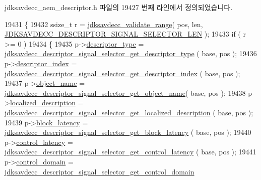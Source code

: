 jdksavdecc\+\_\+aem\+\_\+descriptor.\+h 파일의 19427 번째 라인에서 정의되었습니다.


\begin{DoxyCode}
19431 \{
19432     ssize\_t r = \hyperlink{group__util_ga9c02bdfe76c69163647c3196db7a73a1}{jdksavdecc\_validate\_range}( pos, len, 
      \hyperlink{group__descriptor__signal__selector_gac2216dd9d51df77aa73eb7459e73022c}{JDKSAVDECC\_DESCRIPTOR\_SIGNAL\_SELECTOR\_LEN} );
19433     \textcolor{keywordflow}{if} ( r >= 0 )
19434     \{
19435         p->\hyperlink{structjdksavdecc__descriptor__signal__selector_ab7c32b6c7131c13d4ea3b7ee2f09b78d}{descriptor\_type} = 
      \hyperlink{group__descriptor__signal__selector_gaeb5dced295d94393a270851da64bf3f7}{jdksavdecc\_descriptor\_signal\_selector\_get\_descriptor\_type}
      ( base, pos );
19436         p->\hyperlink{structjdksavdecc__descriptor__signal__selector_a042bbc76d835b82d27c1932431ee38d4}{descriptor\_index} = 
      \hyperlink{group__descriptor__signal__selector_gaeb9aa2314f6aaf7049efcf52849c0a9f}{jdksavdecc\_descriptor\_signal\_selector\_get\_descriptor\_index}
      ( base, pos );
19437         p->\hyperlink{structjdksavdecc__descriptor__signal__selector_a7d1f5945a13863b1762fc6db74fa8f80}{object\_name} = 
      \hyperlink{group__descriptor__signal__selector_ga01445c4bc3aea886702910ab8483ad13}{jdksavdecc\_descriptor\_signal\_selector\_get\_object\_name}(
       base, pos );
19438         p->\hyperlink{structjdksavdecc__descriptor__signal__selector_a0926f846ca65a83ad5bb06b4aff8f408}{localized\_description} = 
      \hyperlink{group__descriptor__signal__selector_gaf2e3b7274586611438c6e116f6388435}{jdksavdecc\_descriptor\_signal\_selector\_get\_localized\_description}
      ( base, pos );
19439         p->\hyperlink{structjdksavdecc__descriptor__signal__selector_ae2e9f0088d5e900b610d1b2818dfc559}{block\_latency} = 
      \hyperlink{group__descriptor__signal__selector_gad4ea4e29c79525f445ada05031987143}{jdksavdecc\_descriptor\_signal\_selector\_get\_block\_latency}
      ( base, pos );
19440         p->\hyperlink{structjdksavdecc__descriptor__signal__selector_ab2bd4639caaf9a8078b68368afbd63b6}{control\_latency} = 
      \hyperlink{group__descriptor__signal__selector_ga991d1e1e2b1cac5b71080b8206250f66}{jdksavdecc\_descriptor\_signal\_selector\_get\_control\_latency}
      ( base, pos );
19441         p->\hyperlink{structjdksavdecc__descriptor__signal__selector_a8937b22996b7c28ae209f29fe777f03a}{control\_domain} = 
      \hyperlink{group__descriptor__signal__selector_gacdc895fafbd728e73d57da62b3ae47e6}{jdksavdecc\_descriptor\_signal\_selector\_get\_control\_domain}

\end{DoxyCode}
